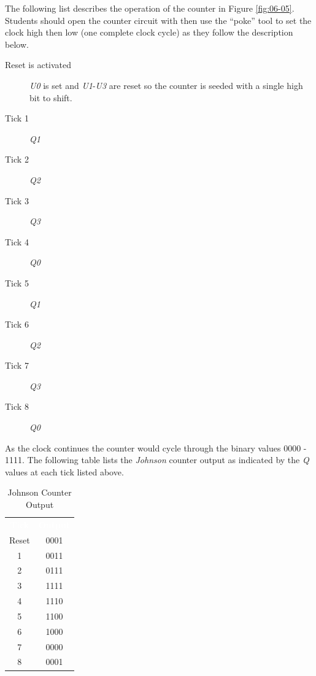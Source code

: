 The following list describes the operation of the counter in Figure \ref{fig:06-05}. Students should open the counter circuit with \LE then use the ``poke'' tool to set the clock high then low (one complete clock cycle) as they follow the description below.

\begin{description}
	\item [Reset is activated] \textit{U0} is set and \textit{U1}-\textit{U3} are reset so the counter is seeded with a single high bit to shift.
	
	\item [Tick 1] \textit{Q1} \textuparrow 
	
	\item [Tick 2] \textit{Q2} \textuparrow
	
	\item [Tick 3] \textit{Q3} \textuparrow 
	
	\item [Tick 4] \textit{Q0} \textdownarrow

	\item [Tick 5] \textit{Q1} \textdownarrow

	\item [Tick 6] \textit{Q2} \textdownarrow
	
	\item [Tick 7] \textit{Q3} \textdownarrow

	\item [Tick 8] \textit{Q0} \textuparrow

\end{description}

As the clock continues the counter would cycle through the binary values 0000 - 1111. The following table lists the \textit{Johnson} counter output as indicated by the \textit{Q} values at each tick listed above.

\begin{table}[H]
	\sffamily
	\newcommand{\head}[1]{\textcolor{white}{\textbf{#1}}}		
	\begin{center}
		\begin{tabular}{cc} 
			\rowcolor{black!75}
			\head{Tick} & \head{Output} \\
			Reset & 0001 \\
			1 & 0011 \\
			2 & 0111 \\
			3 & 1111 \\
			4 & 1110 \\
			5 & 1100 \\
			6 & 1000 \\
			7 & 0000 \\
			8 & 0001 
		\end{tabular}
	\end{center}
	\caption{Johnson Counter Output}
	\label{tab0605}
\end{table}

